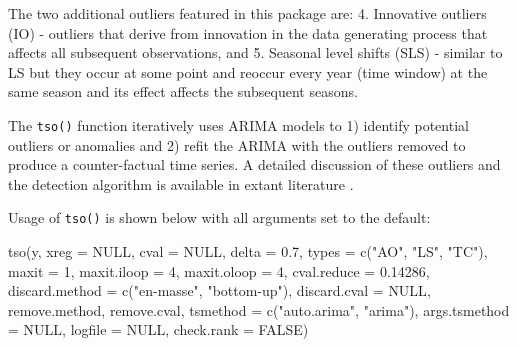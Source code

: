 \documentclass[12pt]{article}
\newenvironment{Shaded}{\begin{snugshade}}{\end{snugshade}}
\newcommand{\AttributeTok}[1]{\textcolor[rgb]{0.77,0.63,0.00}{#1}}
\newcommand{\ConstantTok}[1]{\textcolor[rgb]{0.00,0.00,0.00}{#1}}
\newcommand{\DecValTok}[1]{\textcolor[rgb]{0.00,0.00,0.81}{#1}}
\newcommand{\FloatTok}[1]{\textcolor[rgb]{0.00,0.00,0.81}{#1}}
\newcommand{\FunctionTok}[1]{\textcolor[rgb]{0.00,0.00,0.00}{#1}}
\newcommand{\NormalTok}[1]{#1}
\newcommand{\StringTok}[1]{\textcolor[rgb]{0.31,0.60,0.02}{#1}}
\begin{document}
The two additional outliers featured in this package are: 4. Innovative
outliers (IO) - outliers that derive from innovation in the data
generating process that affects all subsequent observations, and 5.
Seasonal level shifts (SLS) - similar to LS but they occur at some point
and reoccur every year (time window) at the same season and its effect
affects the subsequent seasons.

The \texttt{tso()} function iteratively uses ARIMA models to 1) identify
potential outliers or anomalies and 2) refit the ARIMA with the outliers
removed to produce a counter-factual time series. A detailed discussion
of these outliers and the detection algorithm is available in extant
literature
\citep{chen1993joint, tsoutliers, asghar2017analysis, burman1988outliers}.

Usage of \texttt{tso()} is shown below with all arguments set to the
default:

\begin{Shaded}
\begin{Highlighting}[]
\FunctionTok{tso}\NormalTok{(y, }\AttributeTok{xreg =} \ConstantTok{NULL}\NormalTok{, }\AttributeTok{cval =} \ConstantTok{NULL}\NormalTok{, }\AttributeTok{delta =} \FloatTok{0.7}\NormalTok{, }\AttributeTok{types =} \FunctionTok{c}\NormalTok{(}\StringTok{"AO"}\NormalTok{, }\StringTok{"LS"}\NormalTok{, }\StringTok{"TC"}\NormalTok{), }
    \AttributeTok{maxit =} \DecValTok{1}\NormalTok{, }\AttributeTok{maxit.iloop =} \DecValTok{4}\NormalTok{, }\AttributeTok{maxit.oloop =} \DecValTok{4}\NormalTok{, }\AttributeTok{cval.reduce =} \FloatTok{0.14286}\NormalTok{,    }
    \AttributeTok{discard.method =} \FunctionTok{c}\NormalTok{(}\StringTok{"en{-}masse"}\NormalTok{, }\StringTok{"bottom{-}up"}\NormalTok{), }\AttributeTok{discard.cval =} \ConstantTok{NULL}\NormalTok{, }
\NormalTok{    remove.method, remove.cval, }\AttributeTok{tsmethod =} \FunctionTok{c}\NormalTok{(}\StringTok{"auto.arima"}\NormalTok{, }\StringTok{"arima"}\NormalTok{),   }
    \AttributeTok{args.tsmethod =} \ConstantTok{NULL}\NormalTok{, }\AttributeTok{logfile =} \ConstantTok{NULL}\NormalTok{, }\AttributeTok{check.rank =} \ConstantTok{FALSE}\NormalTok{)}
\end{Highlighting}
\end{Shaded}
\end{document}

